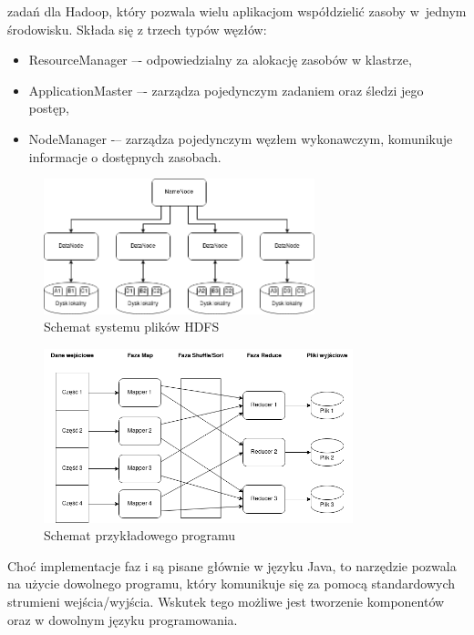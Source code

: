 \begin{enumerate}
            zadań dla Hadoop, który pozwala wielu aplikacjom współdzielić zasoby w~jednym środowisku.
            Składa się z trzech typów węzłów:
            \begin{itemize}
                  \item ResourceManager –- odpowiedzialny za alokację zasobów w klastrze,
                  \item ApplicationMaster –- zarządza pojedynczym zadaniem oraz śledzi jego postęp,
                  \item NodeManager -– zarządza pojedynczym węzłem wykonawczym, komunikuje informacje
                        o dostępnych zasobach.
            \end{itemize}
\end{enumerate}

\begin{figure}
      \centering
      \includegraphics[width=0.7\textwidth]{./graf/HDFS.png}
      \caption{Schemat systemu plików HDFS}
      \label{fig:hdfs}
\end{figure}

\begin{figure}
      \centering
      \includegraphics[width=0.8\textwidth]{./graf/MapReduce.png}
      \caption{Schemat przykładowego programu }
      \label{fig:mapreduce}
\end{figure}

Choć implementacje faz  i  są pisane głównie w języku Java, to
narzędzie  pozwala na użycie dowolnego programu, który komunikuje się
za pomocą standardowych strumieni wejścia/wyjścia. Wskutek tego możliwe jest tworzenie
komponentów  oraz  w dowolnym języku programowania.

